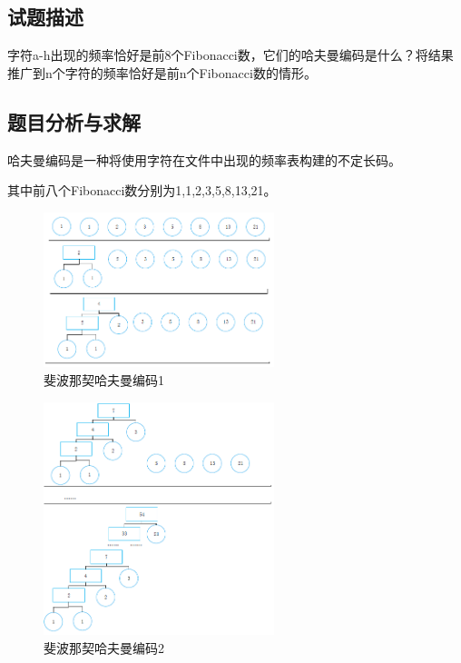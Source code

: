 \documentclass[UTF8]{ctexart}
\begin{document}
    \subsection{试题描述}
    字符a-h出现的频率恰好是前8个Fibonacci数，它们的哈夫曼编码是什么？将结果推广到n个字符的频率恰好是前n个Fibonacci数的情形。

    \subsection{题目分析与求解}
    哈夫曼编码是一种将使用字符在文件中出现的频率表构建的不定长码。

    其中前八个Fibonacci数分别为1,1,2,3,5,8,13,21。

    \begin{figure}[!htb]
      \centering
      \includegraphics[width=0.6\textwidth]{../img/4.1.1.PNG}
      \caption{斐波那契哈夫曼编码1}\label{斐波那契哈夫曼编码1}
    \end{figure}

    \begin{figure}[!htb]
      \centering
      \includegraphics[width=0.6\textwidth]{../img/4.1.2.PNG}
      \caption{斐波那契哈夫曼编码2}\label{斐波那契哈夫曼编码2}
    \end{figure}
\end{document}

